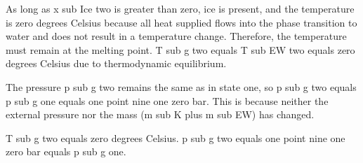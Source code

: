 As long as x sub Ice two is greater than zero, ice is present, and the temperature is zero degrees Celsius because all heat supplied flows into the phase transition to water and does not result in a temperature change. Therefore, the temperature must remain at the melting point. T sub g two equals T sub EW two equals zero degrees Celsius due to thermodynamic equilibrium.  

The pressure p sub g two remains the same as in state one, so p sub g two equals p sub g one equals one point nine one zero bar. This is because neither the external pressure nor the mass (m sub K plus m sub EW) has changed.  

T sub g two equals zero degrees Celsius.  
p sub g two equals one point nine one zero bar equals p sub g one.